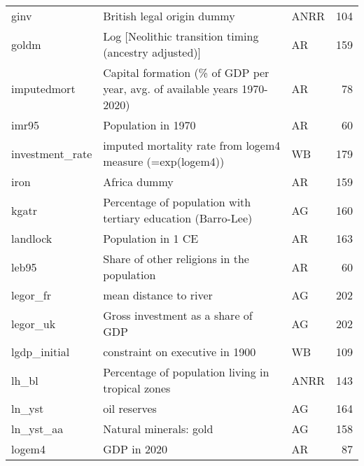 \begin{tabular}{lllr}
ginv                           &                                                British legal origin dummy &   ANRR &   104 \\
goldm                          &                     Log [Neolithic transition timing (ancestry adjusted)] &     AR &   159 \\
imputedmort                    &  Capital formation (\% of GDP per year, avg. of available years 1970-2020) &     AR &    78 \\
imr95                          &                                                        Population in 1970 &     AR &    60 \\
investment\_rate                &                 imputed mortality rate from logem4 measure (=exp(logem4)) &     WB &   179 \\
iron                           &                                                              Africa dummy &     AR &   159 \\
kgatr                          &              Percentage of population with tertiary education (Barro-Lee) &     AG &   160 \\
landlock                       &                                                        Population in 1 CE &     AR &   163 \\
leb95                          &                                Share of other religions in the population &     AR &    60 \\
legor\_fr                       &                                                    mean distance to river &     AG &   202 \\
legor\_uk                       &                                        Gross investment as a share of GDP &     AG &   202 \\
lgdp\_initial                   &                                           constraint on executive in 1900 &     WB &   109 \\
lh\_bl                          &                         Percentage of population living in tropical zones &   ANRR &   143 \\
ln\_yst                         &                                                             oil reserves  &     AG &   164 \\
ln\_yst\_aa                      &                                                    Natural minerals: gold &     AG &   158 \\
logem4                         &                                                               GDP in 2020 &     AR &    87 \\

\end{tabular}

